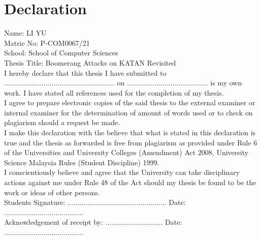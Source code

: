 \chapter{Declaration}
\thispagestyle{empty}
\noindent Name: LI YU \\
Matric No: P-COM0067/21 \\
School: School of Computer Sciences \\
Thesis Title: Boomerang Attacks on KATAN Revisited \\

\noindent I hereby declare that this thesis I have submitted to ........................................................ on ......................................... is my own work. I have stated all references used for the completion of my thesis.\\
\noindent I agree to prepare electronic copies of the said thesis to the external examiner or internal examiner for the determination of amount of words used or to check on plagiarism should a request be made.\\
\noindent I make this declaration with the believe that what is stated in this declaration is true and the thesis as forwarded is free from plagiarism as provided under Rule 6 of the Universities and University Colleges (Amendment) Act 2008, University Science Malaysia Rules (Student Discipline) 1999.\\
\noindent I conscientiously believe and agree that the University can take disciplinary actions against me under Rule 48 of the Act should my thesis be found to be the work or ideas of other persons.\\


\noindent Students Signature: .................................................. Date: ........................................\\
\noindent Acknowledgement of receipt by: ............................. Date: ........................................